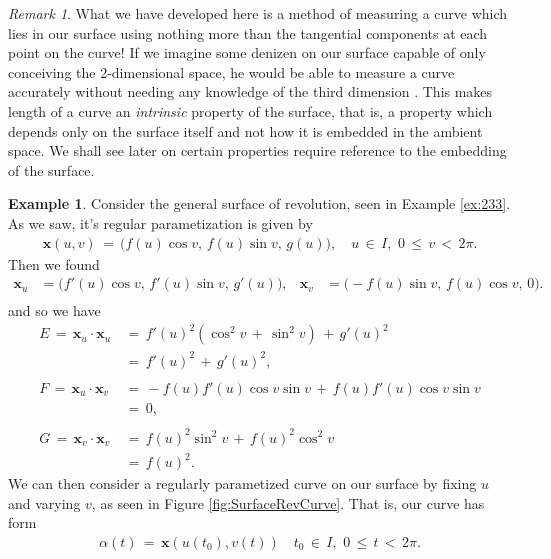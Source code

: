 \documentclass{UKZNcomp}
\newcommand{\vect}[1]{\mathbf{#1}} %
\theoremstyle{definition}
\newtheorem{example}[definition]{Example}
\theoremstyle{remark}
\newtheorem*{remark}{Remark}
\begin{document}
\begin{remark}
What we have developed here is a method of measuring a curve which lies in our surface using nothing more than the tangential components at each point on the curve! If we imagine some denizen on our surface capable of only conceiving the 2-dimensional space, he would be able to measure a curve accurately without needing any knowledge of the third dimension \cite{Shifrin2016}. This makes length of a curve an \textit{intrinsic} property of the surface, that is, a property  which depends only on the surface itself and not how it is embedded in the ambient space. We shall see later on certain properties require reference to the embedding of the surface. 
\end{remark}

\begin{example}
Consider the general surface of revolution, seen in Example \ref{ex:233}. As we saw, it's regular parametization is given by
\begin{align*}
\vect{x}(u,v) \, = \, \big(f(u)\cos v, \,f(u)\sin v, \, g(u)\big), \quad 	u\, \in \, I, \,\, 0\,\leq\,v\,<\,2\pi.
\end{align*}
Then we found 
\begin{align*}
\vect x_u &= \big(f'(u)\cos v,\, f'(u)\sin v, \, g'(u)\big), &
\vect x_v &= \big(-f(u)\sin v,\, f(u)\cos v, \,0\big).\\
\end{align*}
and so we have
\begin{align*}
E \,=\,\vect x_u\cdot\vect x_u \, &= \, f'(u)^2(\cos^2v\,+\,\sin^2v)\,+\,g'(u)^2\\
&=\,f'(u)^2\,+\,g'(u)^2,\\\\
F\,=\,\vect x_u\cdot\vect x_v \, &= \, -f(u)f'(u)\cos v\sin v \, +\, f(u)f'(u)\cos v\sin v\\
&=\,0,\\\\
G\,=\,\vect x_v\cdot\vect x_v\, &=\,f(u)^2\sin^2v\,+\,f(u)^2\cos^2v\\
&=\,f(u)^2.
\end{align*}
We can then consider a regularly parametized curve on our surface by fixing $u$ and varying $v$, as seen in Figure \ref{fig:SurfaceRevCurve}. That is, our curve has form
\begin{align*}
\alpha(t)\,=\,\vect{x}(u(t_0),v(t)) \quad t_0 \,\in\,I,\,\, 0\,\leq\,t\,<\,2\pi.
\end{align*}


\end{example}
\end{document}

